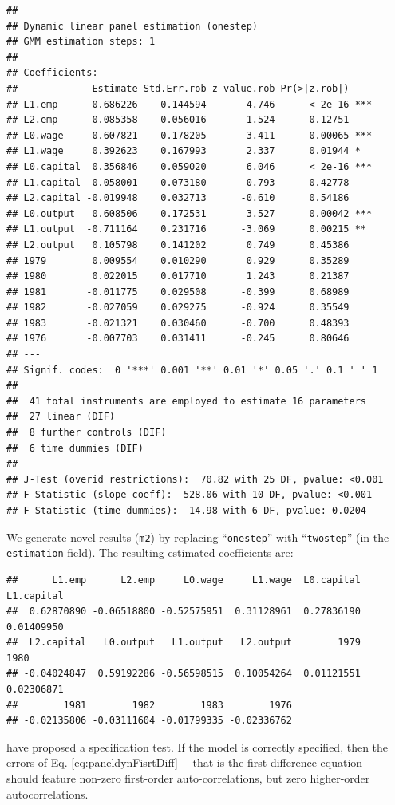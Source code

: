 \documentclass[
  12pt,
]{book}
\theoremstyle{definition}
\theoremstyle{definition}
\theoremstyle{definition}
\theoremstyle{definition}
\theoremstyle{remark}
\begin{document}
\begin{verbatim}
## 
## Dynamic linear panel estimation (onestep)
## GMM estimation steps: 1
## 
## Coefficients:
##             Estimate Std.Err.rob z-value.rob Pr(>|z.rob|)    
## L1.emp      0.686226    0.144594       4.746      < 2e-16 ***
## L2.emp     -0.085358    0.056016      -1.524      0.12751    
## L0.wage    -0.607821    0.178205      -3.411      0.00065 ***
## L1.wage     0.392623    0.167993       2.337      0.01944 *  
## L0.capital  0.356846    0.059020       6.046      < 2e-16 ***
## L1.capital -0.058001    0.073180      -0.793      0.42778    
## L2.capital -0.019948    0.032713      -0.610      0.54186    
## L0.output   0.608506    0.172531       3.527      0.00042 ***
## L1.output  -0.711164    0.231716      -3.069      0.00215 ** 
## L2.output   0.105798    0.141202       0.749      0.45386    
## 1979        0.009554    0.010290       0.929      0.35289    
## 1980        0.022015    0.017710       1.243      0.21387    
## 1981       -0.011775    0.029508      -0.399      0.68989    
## 1982       -0.027059    0.029275      -0.924      0.35549    
## 1983       -0.021321    0.030460      -0.700      0.48393    
## 1976       -0.007703    0.031411      -0.245      0.80646    
## ---
## Signif. codes:  0 '***' 0.001 '**' 0.01 '*' 0.05 '.' 0.1 ' ' 1
## 
##  41 total instruments are employed to estimate 16 parameters
##  27 linear (DIF) 
##  8 further controls (DIF) 
##  6 time dummies (DIF) 
##  
## J-Test (overid restrictions):  70.82 with 25 DF, pvalue: <0.001
## F-Statistic (slope coeff):  528.06 with 10 DF, pvalue: <0.001
## F-Statistic (time dummies):  14.98 with 6 DF, pvalue: 0.0204
\end{verbatim}

We generate novel results (\texttt{m2}) by replacing ``\texttt{onestep}'' with ``\texttt{twostep}'' (in the \texttt{estimation} field). The resulting estimated coefficients are:

\begin{verbatim}
##      L1.emp      L2.emp     L0.wage     L1.wage  L0.capital  L1.capital 
##  0.62870890 -0.06518800 -0.52575951  0.31128961  0.27836190  0.01409950 
##  L2.capital   L0.output   L1.output   L2.output        1979        1980 
## -0.04024847  0.59192286 -0.56598515  0.10054264  0.01121551  0.02306871 
##        1981        1982        1983        1976 
## -0.02135806 -0.03111604 -0.01799335 -0.02336762
\end{verbatim}

\citet{Arellano_Bond_1991} have proposed a specification test. If the model is correctly specified, then the errors of Eq. \eqref{eq:paneldynFisrtDiff} ---that is the first-difference equation--- should feature non-zero first-order auto-correlations, but zero higher-order autocorrelations.
\end{document}
